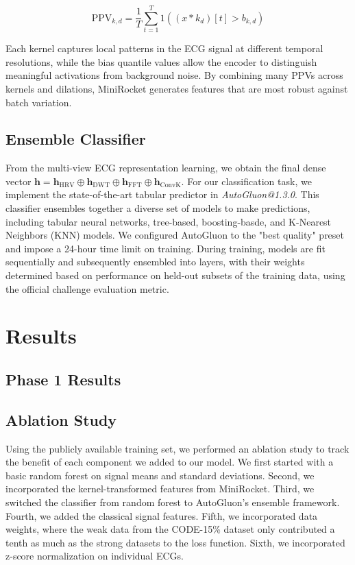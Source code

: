 \documentclass[twocolumn]{cinc}
\begin{document}
\begin{equation}
    \text{PPV}_{k,d} = \frac{1}{T} \sum_{t=1}^{T} 1( (x * k_d)[t] > b_{k,d} )
    \label{ppv}
\end{equation}

Each kernel captures local patterns in the ECG signal at different temporal resolutions, while the bias quantile values allow the encoder to distinguish meaningful activations from background noise. By combining many PPVs across kernels and dilations, MiniRocket generates features that are most robust against batch variation.

\subsection{Ensemble Classifier}
From the multi-view ECG representation learning, we obtain the final dense vector $\mathbf{h}=\mathbf{h}_{\text{HRV}}\oplus \mathbf{h}_{\text{DWT}}\oplus \mathbf{h}_{\text{FFT}}\oplus \mathbf{h}_{\text{ConvK}}$. 
For our classification task, we implement the state-of-the-art tabular predictor in \textit{AutoGluon@1.3.0}. This classifier ensembles together a diverse set of models to make predictions, including tabular neural networks, tree-based, boosting-basde, and K-Nearest Neighbors (KNN) models. We configured AutoGluon to the "best quality" preset and impose a 24-hour time limit on training. During training, models are fit sequentially and subsequently ensembled into layers, with their weights determined based on performance on held-out subsets of the training data, using the official challenge evaluation metric.



\section{Results}
\subsection{Phase 1 Results}

\subsection{Ablation Study}
Using the publicly available training set, we performed an ablation study to track the benefit of each component we added to our model. We first started with a basic random forest on signal means and standard deviations. Second, we incorporated the kernel-transformed features from MiniRocket. Third, we switched the classifier from random forest to AutoGluon’s ensemble framework. Fourth, we added the classical signal features. Fifth, we incorporated data weights, where the weak data from the CODE-15\% dataset only contributed a tenth as much as the strong datasets to the loss function. Sixth, we incorporated z-score normalization on individual ECGs.
\end{document}
